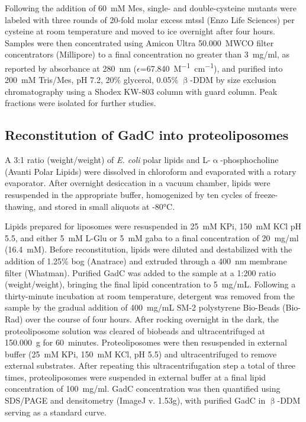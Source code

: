 Following the addition of \SI{60}{mM} Mes, single- and double-cysteine mutants were labeled with three rounds of 20-fold molar excess \gls{mtssl} (Enzo Life Sciences) per cysteine at room temperature and moved to ice overnight after four hours. Samples were then concentrated using Amicon Ultra \SI{50,000}{MWCO} filter concentrators (Millipore) to a final concentration no greater than \SI{3}{mg/ml}, as reported by absorbance at \SI{280}{nm} ($\epsilon$=\SI{67,840}{M^{-1}.cm^{-1}}), and purified into \SI{200}{mM} Tris/Mes, pH 7.2, 20\% glycerol, 0.05\% $\mathrm{\upbeta}$-DDM by size exclusion chromatography using a Shodex KW-803 column with guard column. Peak fractions were isolated for further studies.

\subsection{Reconstitution of GadC into proteoliposomes}

A 3:1 ratio (weight/weight) of \emph{E. coli} polar lipids and L-$\mathrm{\upalpha}$-phosphocholine (Avanti Polar Lipids) were dissolved in chloroform and evaporated with a rotary evaporator. After overnight desiccation in a vacuum chamber, lipids were resuspended in the appropriate buffer, homogenized by ten cycles of freeze-thawing, and stored in small aliquots at -80°C.

Lipids prepared for liposomes were resuspended in \SI{25}{mM} KPi, \SI{150}{mM} KCl pH 5.5, and either \SI{5}{mM} L-Glu or \SI{5}{mM} \gls{gaba} to a final concentration of \SI{20}{mg/ml} (\SI{16.4}{mM}). Before reconstitution, lipids were diluted and destabilized with the addition of 1.25\% \gls{bog} (Anatrace) and extruded through a \SI{400}{nm} membrane filter (Whatman). Purified GadC was added to the sample at a 1:200 ratio (weight/weight), bringing the final lipid concentration to \SI{5}{mg/mL}. Following a thirty-minute incubation at room temperature, detergent was removed from the sample by the gradual addition of \SI{400}{mg/mL} SM-2 polystyrene Bio-Beads (Bio-Rad) over the course of four hours. After rocking overnight in the dark, the proteoliposome solution was cleared of biobeads and ultracentrifuged at \SI{150,000}{g} for \SI{60}{minutes}. Proteoliposomes were then resuspended in external buffer (\SI{25}{mM} KPi, \SI{150}{mM} KCl, pH 5.5) and ultracentrifuged to remove external substrates. After repeating this ultracentrifugation step a total of three times, proteoliposomes were suspended in external buffer at a final lipid concentration of \SI{100}{mg/ml}. GadC concentration was then quantified using SDS/PAGE and densitometry (ImageJ v. 1.53g), with purified GadC in $\mathrm{\upbeta}$-DDM serving as a standard curve.

